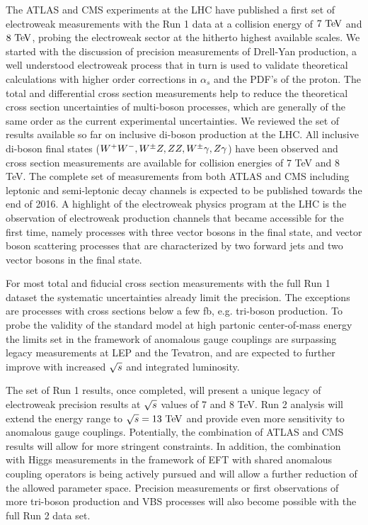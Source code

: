 The ATLAS and CMS experiments at the LHC have published a first set of electroweak measurements with the 
Run 1 data at a collision energy of $7\TeV$ and $8\TeV$,
probing the electroweak sector at the hitherto highest available scales.
We started with the discussion of precision measurements of Drell-Yan production, a well understood electroweak
process that in turn is used to validate theoretical calculations with higher order corrections in
$\alpha_s$ and the PDF's of the proton. The total and differential cross section measurements help to 
reduce the theoretical cross section uncertainties of multi-boson processes, which are generally of the same order as the current
experimental uncertainties.  
We reviewed the set of results available so far on inclusive di-boson production at the LHC. All inclusive di-boson final states
($W^+W^-,W^{\pm}Z,ZZ,W^{\pm}\gamma,Z\gamma$) have been observed and cross section measurements are available for collision energies of 7 TeV and 8 TeV. 
The complete set of measurements from both ATLAS and CMS including leptonic and semi-leptonic decay channels
is expected to be published towards the end of 2016.
A highlight of the electroweak physics program at the LHC is the observation of electroweak production channels 
that became accessible for the first time, namely processes with 
three vector bosons in the final state, and vector boson scattering processes that are 
characterized by two forward jets and two vector bosons in the final state.

For most total and fiducial cross section measurements with the full Run 1 dataset the systematic uncertainties 
already limit the precision. The exceptions are processes with cross sections below a few fb, e.g. tri-boson production. 
To probe the validity of the standard model at high partonic center-of-mass energy the limits
set in the framework of anomalous gauge couplings are surpassing legacy measurements at LEP and the Tevatron,
and are expected to further improve with increased $\sqrt{s}$ and integrated luminosity. 

The set of Run 1 results, once completed, will present a unique legacy of electroweak precision results at 
$\sqrt{s}$ values of 7 and 8 TeV.
Run 2 analysis will extend the energy range to $\rts=13\TeV$ 
and provide even more sensitivity to anomalous gauge couplings. Potentially, 
the combination of ATLAS and CMS results will allow for more stringent constraints. In addition, the combination
with Higgs measurements in the framework of EFT with shared anomalous coupling operators is being 
actively pursued and will allow a further reduction of the allowed parameter space. 
Precision measurements or first observations of more tri-boson production and VBS processes will also become possible with the full 
Run 2 data set. 


 

